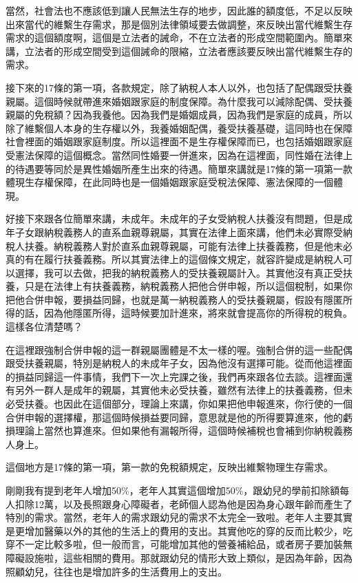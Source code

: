 \documentclass[oneside,sub3section]{ctexbook}
\begin{document}
當然，社會法也不應該低到讓人民無法生存的地步，因此誰的額度低，不足以反映出來當代的維繫生存需求，那是個別法律領域要去做調整，來反映出當代維繫生存需求的這個額度啊，這個是立法者的誡命，不在立法者的形成空間範圍內。簡單來講，立法者的形成空間受到這個誡命的限縮，立法者應該要反映出當代維繫生存的需求。

接下來的17條的第一項，各款規定，除了納稅人本人以外，也包括了配偶跟受扶養親屬。這個時候就帶進來婚姻跟家庭的制度保障。為什麼我可以減除配偶、受扶養親屬的免稅額？因為我養他。因為我們是婚姻成員，因為我們是家庭的成員，所以除了維繫個人本身的生存權以外，我養婚姻配偶，養受扶養基礎，這同時也在保障社會裡面的婚姻跟家庭制度。所以這裡面不是生存權保障而已，也包括婚姻跟家庭受憲法保障的這個概念。當然同性婚要一併進來，因為在這裡面，同性婚在法律上的待遇要等同於是異性婚姻所產生出來的待遇。簡單來講就是17條的第一項第一款體現生存權保障，在此同時也是一個婚姻跟家庭受稅法保障、憲法保障的一個體現。

好接下來跟各位簡單來講，未成年。未成年的子女受納稅人扶養沒有問題，但是成年子女跟納稅義務人的直系血親尊親屬，其實在法律上面來講，他們未必實際受納稅人扶養。納稅義務人對於直系血親尊親屬，可能有法律上扶養義務，但是他未必真的有在履行扶養義務。所以其實法律上的這個條文規定，就容許變成是納稅人可以選擇，我可以去做，把我的納稅義務人的受扶養親屬計入。其實他沒有真正受扶養，只是在法律上有扶養義務，納稅義務人把他合併申報，所以這個稅制，如果你把他合併申報，要損益同歸，也就是萬一納稅義務人的受扶養親屬，假設有隱匿所得的話，因為他隱匿所得，這時候要加計進來，將來就會提高你的所得稅的稅負。這樣各位清楚嗎？

在這裡跟強制合併申報的這一群親屬團體是不太一樣的喔。強制合併的這一些配偶跟受扶養親屬，特別是納稅人的未成年子女，因為他沒有選擇可能。從而他這裡面的損益同歸這一件事情，我們下一次上完課之後，我們再來跟各位去談。這裡面還有另外一群人是成年的親屬，其實他未必受扶養，雖然有法律上的扶養義務，但未必受扶養。也因此在這個部分，理論上來講，你如果把他申報進來，你行使的一個合併申報的選擇權，那這個時候損益要同歸，意思就是他的所得要算進來，他的虧損理論上當然也算進來。但如果他有漏報所得，這個時候補稅也會補到你納稅義務人身上。

這個地方是17條的第一項，第一款的免稅額規定，反映出維繫物理生存需求。

剛剛我有提到老年人增加50\%，老年人其實這個增加50\%，跟幼兒的學前扣除額每人扣除12萬，以及長照跟身心障礙者，老師個人認為他是因為身心跟年齡而產生了特別的需求。當然，老年人的需求跟幼兒的需求不太完全一致啦。老年人主要其實是更增加醫藥以外的其他的生活上的費用的支出。其實他吃的穿的反而比較少，吃穿不一定比較多啦，但一般而言，可能增加其他的營養補給品，或者房子要加裝無障礙設施啦，這些相關的費用。那就跟幼兒的情形大致上類似，是因為年齡，因為照顧幼兒，往往也是增加許多的生活費用上的支出。
\end{document}

